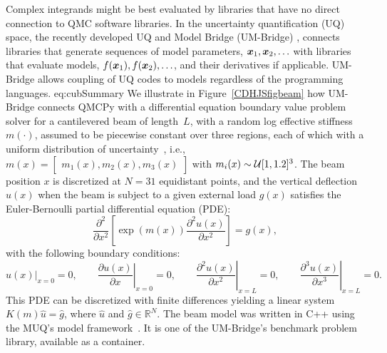 \documentclass[graybox]{svmult}
\begin{document}
Complex integrands might be best evaluated by libraries that have no direct connection to QMC software libraries.  In the uncertainty quantification (UQ) space, the recently developed UQ and Model Bridge (UM-Bridge) \cite{UMBridge23}, connects libraries that generate sequences of model parameters, ${\boldsymbol{x}}_1, {\boldsymbol{x}}_2, \ldots$ with libraries that evaluate models, $f({\boldsymbol{x}}_1), f({\boldsymbol{x}}_2), \ldots$, and their derivatives if applicable. UM-Bridge allows coupling of UQ codes to models regardless of the programming languages.
{eq:cubSummary}
We illustrate in Figure~\ref{CDHJSfigbeam} how UM-Bridge connects QMCPy with a differential equation boundary value problem solver for a cantilevered beam of length~$L$, with a random log effective stiffness $m(\cdot)$, assumed to be piecewise constant over three regions, each of which with a uniform distribution of uncertainty~\cite{ParSee22a}, i.e., $m(x) = \left[\begin{matrix} m_1(x), m_2(x), m_3(x) \end{matrix} \right]$ with $m_i(x) \sim {\mathcal{U}}[1,1.2]^3$.  The beam position $x$ is discretized at $N=31$ equidistant points, and
the vertical deflection $u(x)$ when the beam is subject to a given external load  $g(x)$ satisfies the Euler-Bernoulli partial differential equation (PDE):
$$ \frac{\partial^2}{\partial x^2}\left[ \exp(m(x)) \frac{\partial^2  u(x)}{\partial x^2}\right] = g(x),$$
with the following boundary conditions:
$$ \left.u(x)\right|_{x=0} = 0, \qquad
\left.\frac{\partial u(x)}{\partial x}\right|_{x=0} = 0, \qquad
\left.\frac{\partial^2 u(x)}{\partial x^2}\right|_{x=L} = 0, \qquad  \left.\frac{\partial^3 u(x)}{\partial x^3}\right|_{x=L} = 0. $$
This PDE can be discretized with finite differences yielding a linear system $K(m) \hat{u} = \hat{g}$, where $\hat{u}$ and $\hat{g} \in \mathbb{R}^N$. 
The beam model was written in C++ using the MUQ's model framework~\cite{MUQ2}. It is one of the UM-Bridge's benchmark problem library, available as a container.
\end{document}
